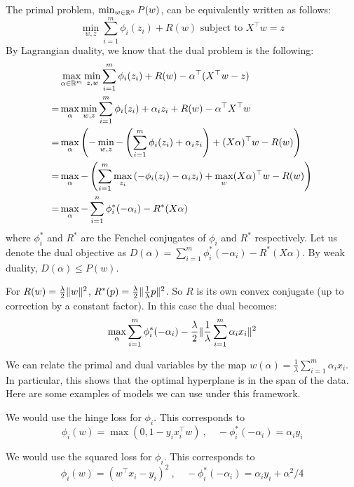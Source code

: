 The primal problem, $\min_{w\in \mathbb{R}^n}P(w)$, can be equivalently written as follows:
\begin{equation}
    \min_{w,z}  \sum_{i=1}^m \phi_i(z_i) + R(w) \text{ subject to } X^\top w=z
\end{equation}
By Lagrangian duality, we know that the dual problem is the following:
\begin{align*}
    &\max_{\alpha \in \mathbb{R}^m} \min_{z,w} \sum_{i=1}^m \phi_i(z_i) + R(w) - \alpha^\top(X^\top w-z) \\
    =&\max_\alpha \min_{w,z} \sum_{i=1}^m \phi_i(z_i) + \alpha_iz_i + R(w) - \alpha^\top X^\top w \\
    =&\max_\alpha \left(- \min_{w,z} - \left(\sum_{i=1}^m \phi_i(z_i)  + \alpha_iz_i \right) + (X\alpha)^\top w -R(w) \right) \\
    =& \max_\alpha - \left( \sum_{i=1}^m \max_{z_i} \left( - \phi_i(z_i) - \alpha_iz_i \right) + \max_w (X\alpha)^\top w - R(w)    \right) \\
    =& \max_\alpha -\sum_{i=1}^n \phi_i^*(-\alpha_i) -R^*(X\alpha)
\end{align*}
where $\phi_i^*$ and $R^*$ are the Fenchel conjugates of $\phi_i$ and $R^*$ respectively.
Let us denote the dual objective as $D(\alpha) = \sum_{i=1}^m \phi_i^*(-\alpha_i) - R^*(X\alpha)$. By weak duality, $D(\alpha) \leq P(w)$.

For $R(w) = \frac{\lambda}{2}\lVert w\rVert^2$, $R^*(p) = \frac{\lambda}{2} \lVert\frac{1}{\lambda} p\rVert^2$. So $R$ is its own convex conjugate (up to correction by a constant factor). In this case the dual becomes:
\[\max_\alpha \sum_{i=1}^m \phi_i^*(-\alpha_i) - \frac{\lambda}{2} \lVert\frac{1}{\lambda} \sum_{i=1}^m \alpha_ix_i\rVert^2 \]

We can relate the primal and dual variables by the map $w(\alpha) = \frac{1}{\lambda} \sum_{i=1}^m \alpha_ix_i$. In particular, this shows that the optimal hyperplane is in the span of the data. Here are some examples of models we can use under this framework.

\begin{example}
We would use the hinge loss for $\phi_i$. This corresponds to \[\phi_i(w) = \max(0,1-y_ix_i^\top w)~,\quad -\phi_i^*(-\alpha_i) = \alpha_i y_i\]
\end{example}

\begin{example}
We would use the squared loss for $\phi_i$. This corresponds to \[\phi_i(w) = (w^\top x_i-y_i)^2~,\quad -\phi_i^*(-\alpha_i) = \alpha_i y_i + \alpha^2/4\]
\end{example}

